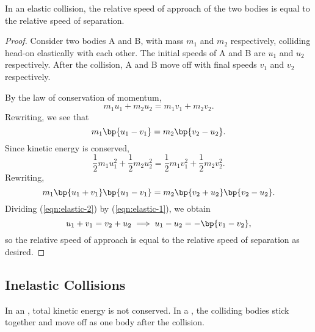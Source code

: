 \begin{proposition}
    In an elastic collision, the relative speed of approach of the two bodies is equal to the relative speed of separation.
\end{proposition}
\begin{proof}
    Consider two bodies A and B, with mass $m_1$ and $m_2$ respectively, colliding head-on elastically with each other. The initial speeds of A and B are $u_1$ and $u_2$ respectively. After the collision, A and B move off with final speeds $v_1$ and $v_2$ respectively.

    By the law of conservation of momentum, \[m_1 u_1 + m_2 u_2 = m_1 v_1 + m_2 v_2.\] Rewriting, we see that
    \begin{equation}\label{eqn:elastic-1}
        m_1 \bp{u_1 - v_1} = m_2 \bp{v_2 - u_2}.
    \end{equation}
    Since kinetic energy is conserved, \[\frac12 m_1 u_1^2 + \frac12 m_2 u_2^2 = \frac12 m_1 v_1^2 + \frac12 m_2 v_2^2.\] Rewriting,
    \begin{equation}\label{eqn:elastic-2}
        m_1\bp{u_1 + v_1}\bp{u_1 - v_1} = m_2 \bp{v_2 + u_2}\bp{v_2 - u_2}.
    \end{equation}
    Dividing (\ref{eqn:elastic-2}) by (\ref{eqn:elastic-1}), we obtain \[u_1 + v_1 = v_2 + u_2 \implies u_1 - u_2 = -\bp{v_1 - v_2},\] so the relative speed of approach is equal to the relative speed of separation as desired.
\end{proof}

\subsection{Inelastic Collisions}

\begin{definition}
    In an , total kinetic energy is not conserved. In a , the colliding bodies stick together and move off as one body after the collision.
\end{definition}